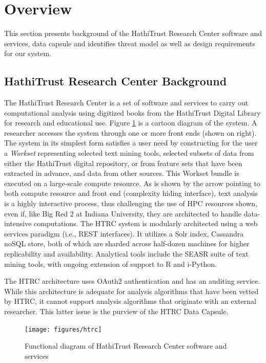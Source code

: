 \documentclass{acm_proc_article-sp}
\begin{document}
\section{Overview} \label{title:overview}
This section presents background of the HathiTrust Research Center software and services, data capsule and identifies threat model as well as design requirements for our system.

\subsection{HathiTrust Research Center Background} \label{subtitle:background}
The HathiTrust Research Center is a set of software and services to carry out computational analysis using digitized books from the HathiTrust Digital Library for research and educational use.
Figure \ref{fig:htrc} is a cartoon diagram of the system.  A researcher accesses the system through one or more front ends (shown on right).  The system in its simplest form satisfies a user need by constructing for the user a \textit{Workset} representing selected text mining tools, selected subsets of data from either the HathiTrust digital repository, or from feature sets that have been extracted in advance, and data from other sources.   This Workset bundle is executed on a large-scale compute resource.   As is shown by the arrow pointing to both compute resource and front end (complexity hiding interface), text analysis is a highly interactive process, thus challenging the use of HPC resources shown, even if, like Big Red 2 at Indiana University, they are architected to handle data-intensive computations.  The HTRC system is modularly architected using a web services paradigm (i.e., REST interfaces).  It utilizes a Solr index, Cassandra noSQL store, both of which are sharded across half-dozen machines for higher replicability and availability.  Analytical tools include the SEASR suite of text mining tools, with ongoing extension of support to R and i-Python.

The HTRC architecture uses OAuth2 authentication and has an auditing service.   While this architecture is adequate for analysis algorithms that have been vetted by HTRC, it cannot support analysis algorithms that originate with an external researcher.  This latter issue is the purview of the HTRC Data Capsule.


\begin{figure}[tbh]
  \centering
  \texttt{[image: figures/htrc]}
  \caption{Functional diagram of HathiTrust Research Center software and services}
  \label{fig:htrc}
\end{figure}
\end{document}
